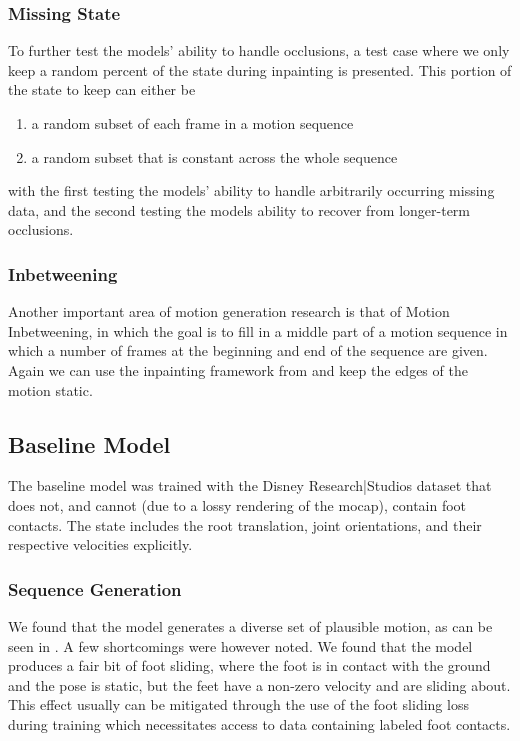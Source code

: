 \subsubsection{Missing State}
To further test the models' ability to handle occlusions, a test case where we only keep a random percent of the state during inpainting is presented. This portion of the state to keep can either be 
\begin{enumerate}
    \item a random subset of each frame in a motion sequence
    \item a random subset that is constant across the whole sequence
\end{enumerate}
with the first testing the models' ability to handle arbitrarily occurring missing data, and the second testing the models ability to recover from longer-term occlusions.

\subsubsection{Inbetweening}
Another important area of motion generation research is that of Motion Inbetweening, in which the goal is to fill in a middle part of a motion sequence in which a number of frames at the beginning and end of the sequence are given. Again we can use the inpainting framework from  and keep the edges of the motion static.


\subsection{Baseline Model}
\label{sec:baseline_evaluation}
The baseline model was trained with the Disney Research|Studios dataset that does not, and cannot (due to a lossy rendering of the mocap), contain foot contacts. The state includes the root translation, joint orientations, and their respective velocities explicitly.

\subsubsection{Sequence Generation}
We found that the model generates a diverse set of plausible motion, as can be seen in . A few shortcomings were however noted. We found that the model produces a fair bit of foot sliding, where the foot is in contact with the ground and the pose is static, but the feet have a non-zero velocity and are sliding about. This effect usually can be mitigated through the use of the foot sliding loss during training which necessitates access to data containing labeled foot contacts.

